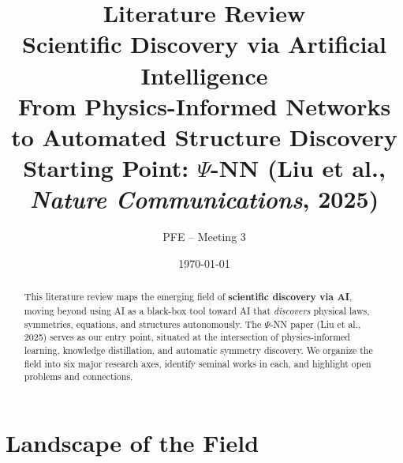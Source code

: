 \documentclass[11pt,a4paper]{article}
\title{\textbf{Literature Review}\\[4pt]
\Large Scientific Discovery via Artificial Intelligence\\[4pt]
\large From Physics-Informed Networks to Automated Structure Discovery\\[6pt]
\normalsize Starting Point: $\Psi$-NN (Liu et al., \textit{Nature Communications}, 2025)}
\author{PFE -- Meeting 3}
\date{\today}
\begin{document}
\maketitle

\begin{abstract}
\noindent This literature review maps the emerging field of \textbf{scientific discovery via AI}, moving beyond using AI as a black-box tool toward AI that \emph{discovers} physical laws, symmetries, equations, and structures autonomously. The $\Psi$-NN paper (Liu et al., 2025) serves as our entry point, situated at the intersection of physics-informed learning, knowledge distillation, and automatic symmetry discovery. We organize the field into six major research axes, identify seminal works in each, and highlight open problems and connections.
\end{abstract}

\tableofcontents
\newpage

\section{Landscape of the Field}
\end{document}
